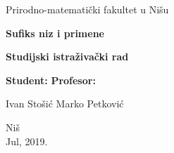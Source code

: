 \begin{titlepage}
\begin{center}
{\large Prirodno-matemati\v cki fakultet u Ni\v su}
\end{center}
\vspace{5cm}
\begin{center}
{\Huge \textbf{Sufiks niz i primene}}
\end{center}
\begin{center}
{\large \textbf{Studijski istra\v ziva\v cki rad}}
\end{center}
\vspace{6cm}


\large \textbf{Student:} \hfill \textbf{Profesor:}

\large Ivan Sto\v si\' c \hfill Marko Petkovi\' c

\vspace{2.5cm}
\begin{center}{Ni\v s\\
Jul, 2019.}\end{center}
\end{titlepage}